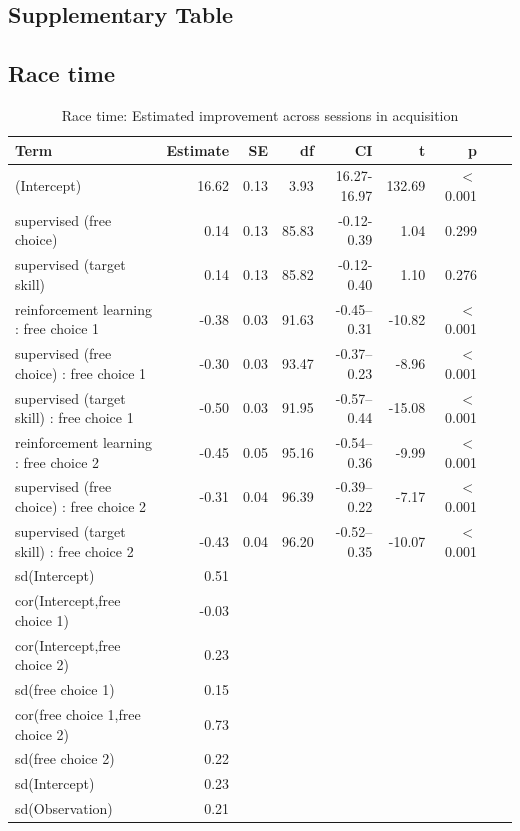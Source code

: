\documentclass[pdflatex,sn-nature]{sn-jnl}%
\theoremstyle{thmstyleone}%
\theoremstyle{thmstyletwo}%
\theoremstyle{thmstylethree}%
\begin{document}
\begin{appendices}
\section{Supplementary Table}

\subsection{Race time}

\begin{table}[h!]
\caption{Race time: Estimated improvement across sessions in acquisition}\label{table_racetime_acquisition_change}
\centering
\begin{tabular}{lrrrrrrrr}
  \hline
 Term & Estimate & SE & df & CI & t & p \\ 
  \hline
 (Intercept) & 16.62 & 0.13 & 3.93 & 16.27-16.97 & 132.69 &  $<$  0.001 \\ 
   supervised (free choice) & 0.14 & 0.13 & 85.83 & -0.12-0.39 & 1.04 &    0.299 \\ 
   supervised (target skill) & 0.14 & 0.13 & 85.82 & -0.12-0.40 & 1.10 &    0.276 \\ 
  reinforcement learning : free choice 1 & -0.38 & 0.03 & 91.63 & -0.45--0.31 & -10.82 &  $<$  0.001 \\ 
   supervised (free choice) : free choice 1 & -0.30 & 0.03 & 93.47 & -0.37--0.23 & -8.96 &  $<$  0.001 \\ 
   supervised (target skill) : free choice 1 & -0.50 & 0.03 & 91.95 & -0.57--0.44 & -15.08 &  $<$  0.001 \\ 
   reinforcement learning : free choice 2 & -0.45 & 0.05 & 95.16 & -0.54--0.36 & -9.99 &  $<$  0.001 \\ 
   supervised (free choice) : free choice 2 & -0.31 & 0.04 & 96.39 & -0.39--0.22 & -7.17 &  $<$  0.001 \\ 
   supervised (target skill) : free choice 2 & -0.43 & 0.04 & 96.20 & -0.52--0.35 & -10.07 &  $<$  0.001 \\ 
   sd(Intercept) & 0.51 &  &  &  &  &  &  \\ 
   cor(Intercept,free choice 1) & -0.03 &  &  &  &  &  &  \\ 
   cor(Intercept,free choice 2) & 0.23 &  &  &  &  &  &  \\ 
   sd(free choice 1) & 0.15 &  &  &  &  &  &  \\ 
   cor(free choice 1,free choice 2) & 0.73 &  &  &  &  &  &  \\ 
  sd(free choice 2) & 0.22 &  &  &  &  &  &  \\ 
   sd(Intercept) & 0.23 &  &  &  &  &  &  \\ 
   sd(Observation) & 0.21 &  &  &  &  &  &  \\ 
   \hline
\end{tabular}
\end{table}



\end{appendices}
\end{document}
